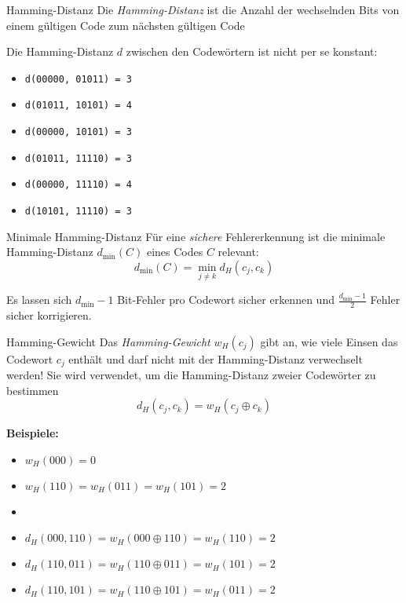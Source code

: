 \begin{definition}{Hamming-Distanz}
    Die \emph{Hamming-Distanz} ist die Anzahl der wechselnden Bits von einem gültigen Code zum nächsten gültigen Code
\end{definition}

Die Hamming-Distanz $d$ zwischen den Codewörtern ist nicht per se konstant:
\begin{multicols}{3}
    \begin{itemize}
        \item \texttt{d(00000, 01011) = 3}
        \item \texttt{d(01011, 10101) = 4}
        \item \texttt{d(00000, 10101) = 3}
        \item \texttt{d(01011, 11110) = 3}
        \item \texttt{d(00000, 11110) = 4}
        \item \texttt{d(10101, 11110) = 3}
    \end{itemize}
\end{multicols}

\begin{definition}{Minimale Hamming-Distanz}
    Für eine \emph{sichere} Fehlererkennung ist die minimale Hamming-Distanz $d_{\min}(C)$ eines Codes $C$ relevant: \[d_{\min}(C) = \min \limits_{j \neq k} d_H(c_j, c_k)\]
\end{definition}
Es lassen sich $d_{\min} - 1$ Bit-Fehler pro Codewort sicher erkennen und $\frac{d_{\min} - 1}{2}$ Fehler sicher korrigieren.
\begin{definition}{Hamming-Gewicht}
    Das \emph{Hamming-Gewicht} $w_H(c_j)$ gibt an, wie viele Einsen das Codewort $c_j$ enthält und darf nicht mit der Hamming-Distanz verwechselt werden!
    Sie wird verwendet, um die Hamming-Distanz zweier Codewörter zu bestimmen \[d_H(c_j,c_k) = w_H(c_j \oplus c_k)\]
\end{definition}

\textbf{Beispiele:}
\begin{multicols}{2}
    \begin{itemize}
        \item $w_H(000) = 0$
        \item $w_H(110) = w_H(011) = w_H(101) = 2$
        \item[]
    \end{itemize}
    \begin{itemize}
        \item $d_H(000,110) = w_H(000 \oplus 110) = w_H(110) = 2$
        \item $d_H(110,011) = w_H(110 \oplus 011) = w_H(101) = 2$
        \item $d_H(110,101) = w_H(110 \oplus 101) = w_H(011) = 2$
    \end{itemize}
\end{multicols}

